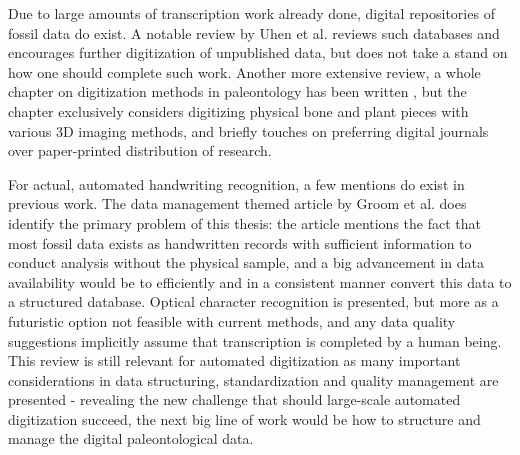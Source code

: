 \documentclass{article}
\begin{document}
Due to large amounts of transcription work already done, digital repositories of fossil data do exist. A notable review 
by Uhen et al. \cite{uhenCardCatalogsComputers2013} reviews such databases and encourages further 
digitization of unpublished data, but does not take a stand on how one should complete such work.
Another more extensive review, a whole chapter on digitization methods in paleontology has been written \cite{mallisonDigitizingMethodsPaleontology2011},
but the chapter exclusively considers digitizing physical bone and plant pieces with various 3D imaging methods, and briefly touches on preferring digital journals over 
paper-printed distribution of research.

For actual, automated handwriting recognition, a few mentions do exist in previous work. The data management themed 
article by Groom et al. \cite{groomImprovedStandardizationTranscribed2019} does identify the primary 
problem of this thesis: the article mentions the fact that most fossil data exists as handwritten records with sufficient information 
to conduct analysis without the physical sample, and a big advancement in data availability would be to efficiently and in a consistent 
manner convert this data to a structured database. Optical character recognition is presented, but more as a futuristic option 
not feasible with current methods, and any data quality suggestions implicitly assume that transcription is completed 
by a human being. This review is still relevant for automated digitization as many important considerations in data structuring,
standardization and quality management are presented - revealing the new challenge that should large-scale automated digitization succeed,
the next big line of work would be how to structure and manage the digital paleontological data.
\end{document}
